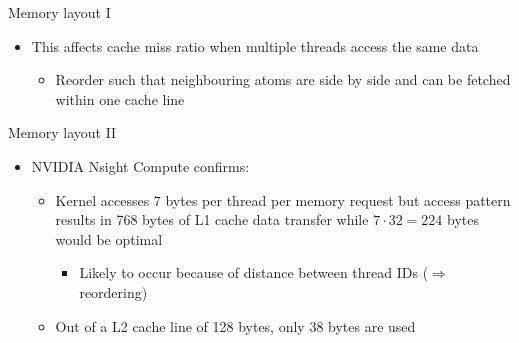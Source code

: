 \documentclass[12pt,xcolor={rgb},t]{beamer}
\begin{document}
\begin{frame}[fragile]{Memory layout I}
\begin{itemize}
\begin{figure}[!H]
        \end{figure}
        \item This affects cache miss ratio when multiple threads access the same data
        \begin{itemize}
            \item Reorder such that neighbouring atoms are side by side and can be fetched within one cache line
        \end{itemize}
    \end{itemize}

\end{frame}

\begin{frame}[fragile]{Memory layout II}

    \begin{itemize}
        \item NVIDIA Nsight Compute confirms:
        \begin{itemize}
            \item Kernel accesses 7 bytes per thread per memory request but access pattern results in 768 bytes of
            L1 cache data transfer while $7 \cdot 32 = 224$ bytes would be optimal
            \begin{itemize}
                \item Likely to occur because of distance between thread IDs ($\Rightarrow$ reordering)
            \end{itemize}
            \item Out of a L2 cache line of 128 bytes, only 38 bytes are used
        \end{itemize}
    \end{itemize}

\end{frame}
\end{document}
